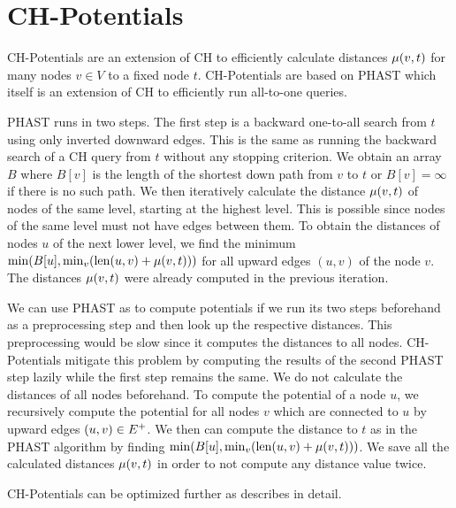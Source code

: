\section{CH-Potentials\label{sec:ch_pot}}
CH-Potentials \cite{strasser:2021b} are an extension of CH to efficiently calculate distances $\mu(v,t)$ for many nodes $v \in V$ to a fixed node $t$. CH-Potentials are based on PHAST \cite{delling:2011} which itself is an extension of CH to efficiently run all-to-one queries.

PHAST runs in two steps. The first step is a backward one-to-all search from $t$ using only inverted downward edges. This is the same as running the backward search of a CH query from $t$ without any stopping criterion. We obtain an array $B$ where $B[v]$ is the length of the shortest down path from $v$ to $t$ or $B[v]=\infty$ if there is no such path. We then iteratively calculate the distance $\mu(v,t)$ of nodes of the same level, starting at the highest level. This is possible since nodes of the same level must not have edges between them. To obtain the distances of nodes $u$ of the next lower level, we find the minimum $\min(B[u], \min_v(\operatorname{len}(u,v) + \mu(v,t)))$ for all upward edges $(u,v)$ of the node $v$. The distances $\mu(v,t)$ were already computed in the previous iteration.

We can use PHAST as to compute potentials if we run its two steps beforehand as a preprocessing step and then look up the respective distances. This preprocessing would be slow since it computes the distances to all nodes. CH-Potentials mitigate this problem by computing the results of the second PHAST step lazily while the first step remains the same. We do not calculate the distances of all nodes beforehand. To compute the potential of a node $u$, we recursively compute the potential for all nodes $v$ which are connected to $u$ by upward edges $(u,v) \in E^+$. We then can compute the distance to $t$ as in the PHAST algorithm by finding $\min(B[u], \min_v(\operatorname{len}(u,v) + \mu(v,t)))$. We save all the calculated distances $\mu(v,t)$ in order to not compute any distance value twice.

CH-Potentials can be optimized further as \cite{strasser:2021b} describes in detail.